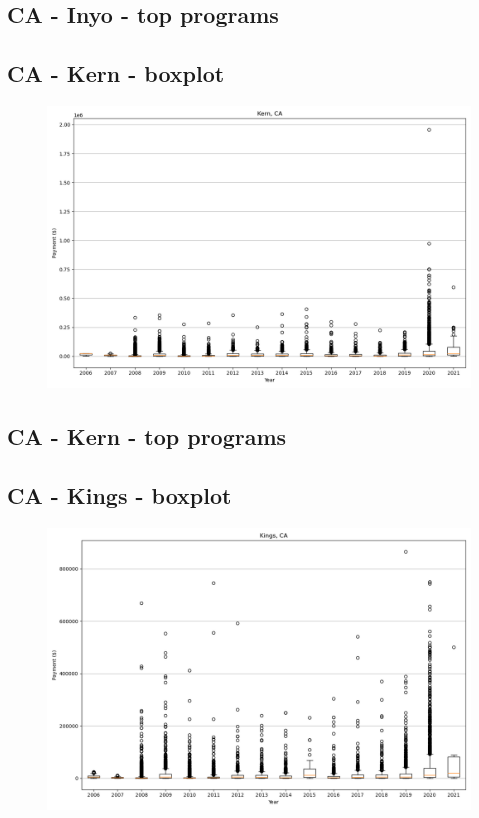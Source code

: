 \subsection*{CA - Inyo - top programs}

\newpage
\subsection*{CA - Kern - boxplot}
\begin{figure}[h]
\centering
\includegraphics[width=7in]{../output/boxplots/counties/Kern-CA_boxplot.png}
\end{figure}


\subsection*{CA - Kern - top programs}

\newpage
\subsection*{CA - Kings - boxplot}
\begin{figure}[h]
\centering
\includegraphics[width=7in]{../output/boxplots/counties/Kings-CA_boxplot.png}
\end{figure}


